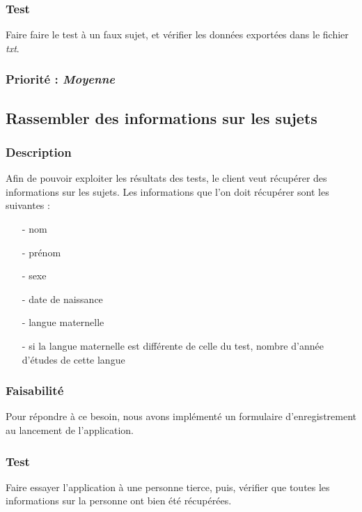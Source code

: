 \subsubsection{Test}

Faire faire le test à un faux sujet, et vérifier les données exportées dans le fichier \textit{txt}.

\subsubsection{Priorité : \textit{Moyenne}}

\subsection{Rassembler des informations sur les sujets}

\subsubsection{Description}

Afin de pouvoir exploiter les résultats des tests, le client veut récupérer des informations sur les sujets.
Les informations que l’on doit récupérer sont les suivantes :\\
\begin{itemize}
 \item[-]  nom
 \item[-]  prénom
 \item[-]  sexe
 \item[-]  date de naissance
 \item[-]  langue maternelle
 \item[-]  si la langue maternelle est différente de celle du test, nombre d’année d’études de cette langue
\end{itemize}

\subsubsection{Faisabilité}
  
	Pour répondre à ce besoin, nous avons implémenté un formulaire d’enregistrement au lancement de l’application.

\subsubsection{Test}

Faire essayer l’application à une personne tierce, puis, vérifier que toutes les informations sur la personne ont bien été récupérées.

